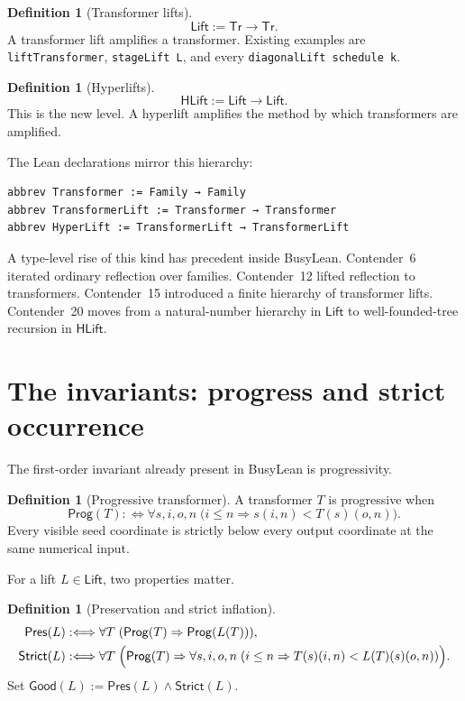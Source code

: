 \documentclass[11pt]{article}
\theoremstyle{definition}
\newtheorem{definition}[theorem]{Definition}
\theoremstyle{remark}
\newcommand{\code}[1]{\texttt{#1}}
\newcommand{\Tr}{\mathsf{Tr}}
\newcommand{\Lift}{\mathsf{Lift}}
\newcommand{\HLift}{\mathsf{HLift}}
\newcommand{\Prog}{\mathsf{Prog}}
\newcommand{\Good}{\mathsf{Good}}
\begin{document}
\begin{definition}[Transformer lifts]
\[
\Lift := \Tr\to\Tr.
\]
A transformer lift amplifies a transformer.  Existing examples are
\code{liftTransformer}, \code{stageLift L}, and every
\code{diagonalLift schedule k}.
\end{definition}

\begin{definition}[Hyperlifts]
\[
\HLift := \Lift\to\Lift.
\]
This is the new level.  A hyperlift amplifies the method by which transformers
are amplified.
\end{definition}

The Lean declarations mirror this hierarchy:

\begin{lstlisting}
abbrev Transformer := Family → Family
abbrev TransformerLift := Transformer → Transformer
abbrev HyperLift := TransformerLift → TransformerLift
\end{lstlisting}

A type-level rise of this kind has precedent inside BusyLean.  Contender~6
iterated ordinary reflection over families.  Contender~12 lifted reflection to
transformers.  Contender~15 introduced a finite hierarchy of transformer
lifts.  Contender~20 moves from a natural-number hierarchy in \(\Lift\) to
well-founded-tree recursion in \(\HLift\).

\section{The invariants: progress and strict occurrence}

The first-order invariant already present in BusyLean is progressivity.

\begin{definition}[Progressive transformer]
A transformer \(T\) is progressive when
\[
\Prog(T) :\Longleftrightarrow
\forall s,i,o,n\;\bigl(i\le n\Rightarrow s(i,n)<T(s)(o,n)\bigr).
\]
Every visible seed coordinate is strictly below every output coordinate at the
same numerical input.
\end{definition}

For a lift \(L\in\Lift\), two properties matter.

\begin{definition}[Preservation and strict inflation]
\begin{align*}
\mathsf{Pres}(L)&:\Longleftrightarrow
  \forall T\;(\Prog(T)\Rightarrow\Prog(L(T))),\\
\mathsf{Strict}(L)&:\Longleftrightarrow
  \forall T\;\Bigl(\Prog(T)\Rightarrow
  \forall s,i,o,n\;(i\le n\Rightarrow T(s)(i,n)<L(T)(s)(o,n))\Bigr).
\end{align*}
Set \(\Good(L):=\mathsf{Pres}(L)\wedge\mathsf{Strict}(L)\).
\end{definition}
\end{document}
